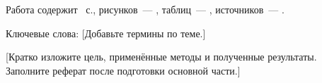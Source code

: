 Работа содержит \pageref{LastPage}~с., рисунков~--- ,
таблиц~--- , источников~--- .

Ключевые слова: [Добавьте термины по теме.]

[Кратко изложите цель, применённые методы и полученные результаты.
Заполните реферат после подготовки основной части.]
